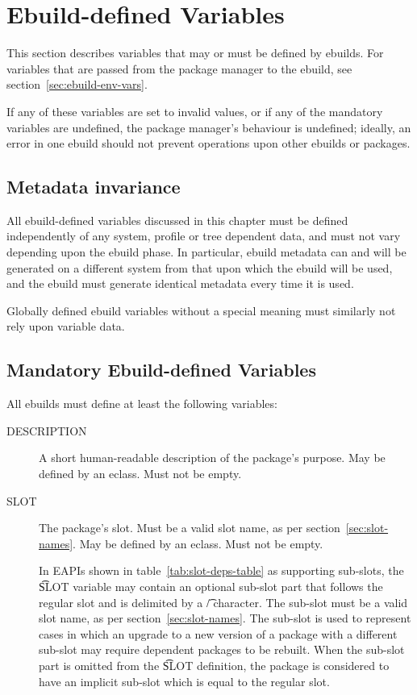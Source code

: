 \chapter{Ebuild-defined Variables}
\label{sec:ebuild-vars}

\note This section describes variables that may or must be defined by ebuilds. For
variables that are passed from the package manager to the ebuild, see section~\ref{sec:ebuild-env-vars}.

If any of these variables are set to invalid values, or if any of the mandatory variables are
undefined, the package manager's behaviour is undefined; ideally, an error in one ebuild should not
prevent operations upon other ebuilds or packages.

\section{Metadata invariance}
\label{sec:metadata-invariance}

All ebuild-defined variables discussed in this chapter must be defined independently of
any system, profile or tree dependent data, and must not vary depending upon the ebuild
phase. In particular, ebuild metadata can and will be generated on a different system from that upon
which the ebuild will be used, and the ebuild must generate identical metadata every time it
is used.

Globally defined ebuild variables without a special meaning must similarly not rely upon
variable data.

\section{Mandatory Ebuild-defined Variables}

All ebuilds must define at least the following variables:

\begin{description}
\item[DESCRIPTION] A short human-readable description of the package's purpose. May be defined by an
    eclass. Must not be empty.
\item[SLOT] The package's slot. Must be a valid slot name, as per section~\ref{sec:slot-names}.
    May be defined by an eclass. Must not be empty.

    In EAPIs shown in table~\ref{tab:slot-deps-table} as supporting sub-slots, the \t{SLOT} variable
    may contain an optional sub-slot part that follows the regular slot and is delimited by a \t{/}
    character. The sub-slot must be a valid slot name, as per section~\ref{sec:slot-names}.
    The sub-slot is used to represent cases in which an upgrade to a new version of a package with
    a different sub-slot may require dependent packages to be rebuilt. When the sub-slot part is
    omitted from the \t{SLOT} definition, the package is considered to have an implicit sub-slot
    which is equal to the regular slot.
\end{description}

